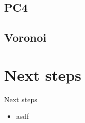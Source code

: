 \documentclass[9pt, aspectratio=43, english]{beamer}
\begin{document}
\subsection{PC4}


\subsection{Voronoi}


\section{Next steps}
\begin{frame}{Next steps}
    \begin{itemize}
        \item asdf
    \end{itemize}
\end{frame}
\end{document}

